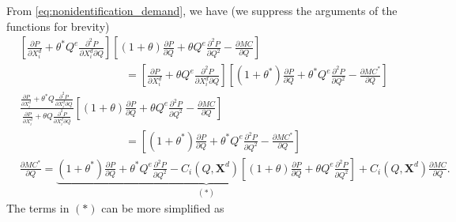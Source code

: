 \documentclass[11pt, a4paper]{article}
\begin{document}
From \eqref{eq:nonidentification_demand}, we have (we suppress the arguments of the functions for brevity)
\begin{align}
    &\left[\frac{\partial P}{\partial X^{d}_i} + \theta^{*} Q^e\frac{\partial^2 P}{\partial X^{d}_i\partial Q}\right]\left[(1+\theta)\frac{\partial P}{\partial Q} + \theta Q^e\frac{\partial^2 P}{\partial Q^2} - \frac{\partial MC}{\partial Q}\right] \\
    & \hspace{4cm}= \left[\frac{\partial P}{\partial X^{d}_i} + \theta Q^e\frac{\partial^2 P}{\partial X^{d}_i\partial Q}\right]\left[(1+\theta^{*})\frac{\partial P}{\partial Q} + \theta^{*} Q^e\frac{\partial^2 P}{\partial Q^2} - \frac{\partial MC^{*}}{\partial Q}
    \right]\\
    & \frac{\frac{\partial P}{\partial X^{d}_i} + \theta^{*} Q\frac{\partial^2 P}{\partial X^{d}_i\partial Q} }{\frac{\partial P}{\partial X^{d}_i} + \theta Q\frac{\partial^2 P}{\partial X^{d}_i\partial Q} }\left[(1+\theta)\frac{\partial P}{\partial Q} + \theta Q^e\frac{\partial^2 P}{\partial Q^2} - \frac{\partial MC}{\partial Q}\right]\\
    &\hspace{4cm} =\left[(1+\theta^{*})\frac{\partial P}{\partial Q} + \theta^{*} Q^e\frac{\partial^2 P}{\partial Q^2} - \frac{\partial MC^{*}}{\partial Q}
    \right]\\
    & \frac{\partial MC^{*}}{\partial Q} = \underbrace{(1+\theta^{*})\frac{\partial P}{\partial Q} + \theta^{*} Q^e\frac{\partial^2 P}{\partial Q^2} - C_i(Q, \bm{X}^{d}) \left[(1+\theta)\frac{\partial P}{\partial Q} + \theta Q^e\frac{\partial^2 P}{\partial Q^2} \right]}_{(\ast)} + C_i(Q, \bm{X}^{d})\frac{\partial MC}{\partial Q}.
\end{align}
The terms in $(\ast)$ can be more simplified as 
\end{document}
